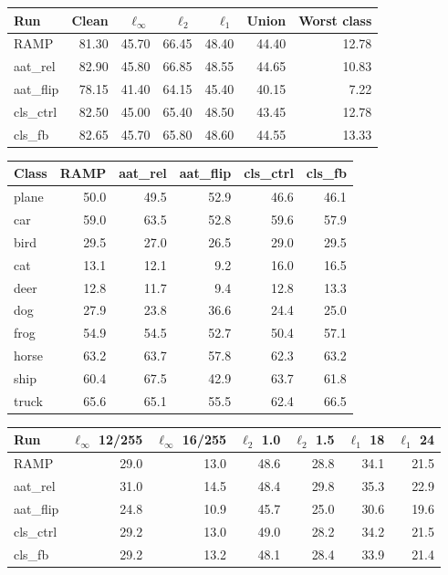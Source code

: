 \begin{tabular}{lrrrrrr}\toprule
Run & Clean & $\ell_\infty$ & $\ell_2$ & $\ell_1$ & Union & Worst class \\\midrule
RAMP & 81.30 & 45.70 & 66.45 & 48.40 & 44.40 & 12.78 \\
aat\_rel & 82.90 & 45.80 & 66.85 & 48.55 & 44.65 & 10.83 \\
aat\_flip & 78.15 & 41.40 & 64.15 & 45.40 & 40.15 & 7.22 \\
cls\_ctrl & 82.50 & 45.00 & 65.40 & 48.50 & 43.45 & 12.78 \\
cls\_fb & 82.65 & 45.70 & 65.80 & 48.60 & 44.55 & 13.33 \\
\bottomrule\end{tabular}

\begin{tabular}{lrrrrr}\toprule
Class & RAMP & aat\_rel & aat\_flip & cls\_ctrl & cls\_fb \\\midrule
plane & 50.0 & 49.5 & 52.9 & 46.6 & 46.1 \\
car & 59.0 & 63.5 & 52.8 & 59.6 & 57.9 \\
bird & 29.5 & 27.0 & 26.5 & 29.0 & 29.5 \\
cat & 13.1 & 12.1 & 9.2 & 16.0 & 16.5 \\
deer & 12.8 & 11.7 & 9.4 & 12.8 & 13.3 \\
dog & 27.9 & 23.8 & 36.6 & 24.4 & 25.0 \\
frog & 54.9 & 54.5 & 52.7 & 50.4 & 57.1 \\
horse & 63.2 & 63.7 & 57.8 & 62.3 & 63.2 \\
ship & 60.4 & 67.5 & 42.9 & 63.7 & 61.8 \\
truck & 65.6 & 65.1 & 55.5 & 62.4 & 66.5 \\
\bottomrule\end{tabular}

\begin{tabular}{lrrrrrr}\toprule
Run & $\ell_\infty$ 12/255 & $\ell_\infty$ 16/255 & $\ell_2$ 1.0 & $\ell_2$ 1.5 & $\ell_1$ 18 & $\ell_1$ 24 \\\midrule
RAMP & 29.0 & 13.0 & 48.6 & 28.8 & 34.1 & 21.5 \\
aat\_rel & 31.0 & 14.5 & 48.4 & 29.8 & 35.3 & 22.9 \\
aat\_flip & 24.8 & 10.9 & 45.7 & 25.0 & 30.6 & 19.6 \\
cls\_ctrl & 29.2 & 13.0 & 49.0 & 28.2 & 34.2 & 21.5 \\
cls\_fb & 29.2 & 13.2 & 48.1 & 28.4 & 33.9 & 21.4 \\
\bottomrule\end{tabular}
